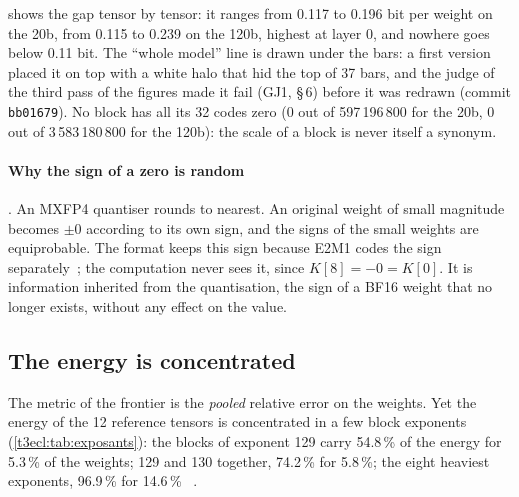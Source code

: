 \begin{figure}[tbp]
\centering
\GrapheEclZeros
{}
\label{fig:t3-ecl-zeros}
\end{figure}

 shows the gap tensor by tensor: it ranges from 0.117 to 0.196 bit per weight on the 20b, from 0.115 to 0.239 on the 120b, highest at layer 0, and nowhere goes below 0.11 bit. The ``whole model'' line is drawn under the bars: a first version placed it on top with a white halo that hid the top of 37 bars, and the judge of the third pass of the figures made it fail (GJ1,  §\,6) before it was redrawn (commit \texttt{bb01679}). No block has all its 32 codes zero (0 out of 597\,196\,800 for the 20b, 0 out of 3\,583\,180\,800 for the 120b): the scale of a block is never itself a synonym.

\paragraph{Why the sign of a zero is random} \calc. An MXFP4 quantiser rounds to nearest. An original weight of small magnitude becomes $\pm0$ according to its own sign, and the signs of the small weights are equiprobable. The format keeps this sign because E2M1 codes the sign separately~\cite{ocpmx2023}; the computation never sees it, since $K[8] = -0 = K[0]$. It is information inherited from the quantisation, the sign of a BF16 weight that no longer exists, without any effect on the value.

\subsection{The energy is concentrated}

The metric of the frontier is the \emph{pooled} relative error on the weights. Yet the energy of the 12 reference tensors is concentrated in a few block exponents (\cref{t3ecl:tab:exposants}): the blocks of exponent 129 carry 54.8\,\% of the energy for 5.3\,\% of the weights; 129 and 130 together, 74.2\,\% for 5.8\,\%; the eight heaviest exponents, 96.9\,\% for 14.6\,\% \mes~\calc.

